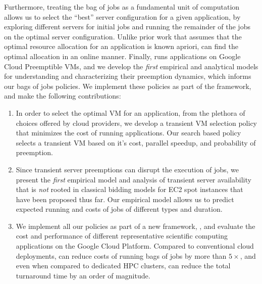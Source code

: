 %
Furthermore, treating the bag of jobs as a fundamental unit of computation allows us to select the ``best'' server configuration for a given application, by exploring different servers for initial jobs and running the remainder of the jobs on the optimal server configuration. 
Unlike prior work that assumes that the optimal resource allocation for an application is known apriori, \sysname can find the optimal allocation in an online manner. 
Finally, \sysname runs applications on Google Cloud Preemptible VMs, and we develop the \emph{first} empirical and analytical models for understanding and characterizing their preemption dynamics, which informs our bags of jobs policies. 
We implement these policies as part of the \sysname framework, and make the following contributions:
\begin{enumerate}[leftmargin=12pt]
\item In order to select the optimal VM for an application, from the plethora of choices offered by cloud providers, we develop a transient VM selection policy that minimizes the cost of running applications. Our search based policy selects a transient VM based on it's cost, parallel speedup, and probability of preemption. 

  
\item Since transient server preemptions can disrupt the execution of jobs, we present the \emph{first} empirical model and analysis of transient server availability that is \emph{not} rooted in classical bidding models for EC2 spot instances that have been proposed thus far. Our empirical model allows us to predict expected running and costs of jobs of different types and duration.

  
\item We implement all our policies as part of a new framework, \sysname, and evaluate the cost and performance of different representative scientific computing  applications on the Google Cloud Platform. Compared to conventional cloud deployments, \sysname can reduce costs of running bags of jobs by more than $5\times$, and even when compared to dedicated HPC clusters, can reduce the total turnaround time by an order of magnitude. 

\end{enumerate}

